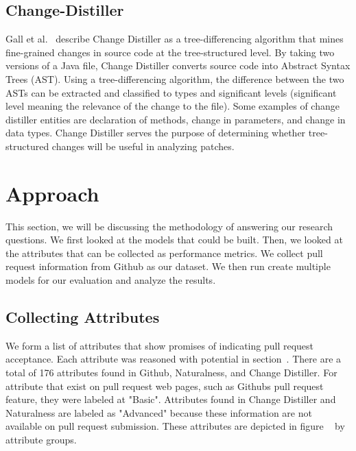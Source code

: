 \documentclass[10pt, conference]{IEEEtran}
\begin{document}
\subsection{Change-Distiller}
Gall et al.~\cite{Gall:2009:CAE:1495795.1495953} describe Change Distiller as a tree-differencing algorithm that mines fine-grained changes in source code at the tree-structured level. By taking two versions of a Java file, Change Distiller converts source code into Abstract Syntax Trees (AST). Using a tree-differencing algorithm, the difference between the two ASTs can be extracted and classified to types and significant levels (significant level meaning the relevance of the change to the file). Some examples of change distiller entities are declaration of methods, change in parameters, and change in data types. Change Distiller serves the purpose of determining whether tree-structured changes will be useful in analyzing patches.

\section{Approach}
\label{approach}
This section, we will be discussing the methodology of answering our research questions. We first looked at the models that could be built. Then, we looked at the attributes that can be collected as performance metrics. We collect pull request information from Github as our dataset. We then run create multiple models for our evaluation and analyze the results.

\subsection{Collecting Attributes}
We form a list of attributes that show promises of indicating pull request acceptance. Each attribute was reasoned with potential in section~\cite{background}. There are a total of 176 attributes found in Github, Naturalness, and Change Distiller. For attribute that exist on pull request web pages, such as Github\textquotesingle s pull request feature, they were labeled at "Basic". Attributes found in Change Distiller and Naturalness are labeled as "Advanced" because these information are not available on pull request submission. These attributes are depicted in figure ~\cite{figureListOfMetrics} by attribute groups.
\end{document}
